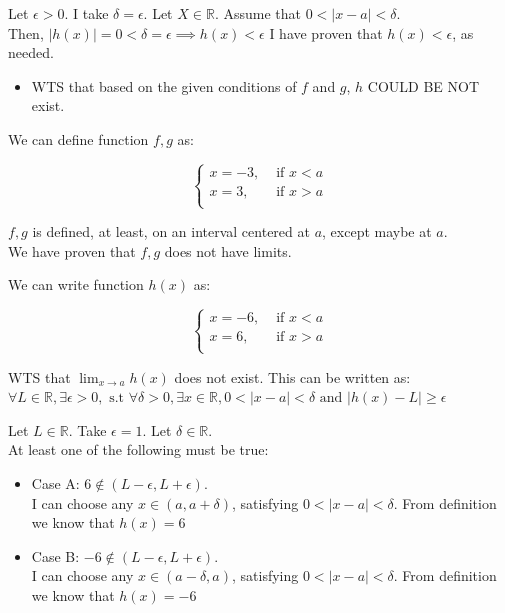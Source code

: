 \documentclass[12pt]{exam}
\newcommand {\DS} [1] {${\displaystyle #1}$}
\newcommand{\R}{\mathbb{R}}
\begin{document}
\begin{enumerate}
Let $\epsilon > 0.$ I take $\delta = \epsilon$. Let $X \in \R$. Assume that $0 < |x - a| < \delta$. \\
Then, $|h(x)| = 0 < \delta = \epsilon \implies h(x) < \epsilon$
I have proven that $h(x) < \epsilon$, as needed.


\begin{itemize}
	\item WTS that based on the given conditions of $f$ and $g$, $h$ COULD BE NOT exist.
\end{itemize}


We can define function $f, g$ as: 

$$
\begin{cases}
	x = -3, &\text{ if }x < a\\
	x = 3, &\text{ if } x > a\\
\end{cases}
$$

$f, g$ is defined, at least, on an interval centered at $a$, except maybe at $a$.\\

We have proven that $f, g$ does not have limits.

We can write function $h(x)$ as:

$$
\begin{cases}
	x = -6, &\text{ if }x < a\\
	x = 6, &\text{ if } x > a\\
\end{cases}
$$

WTS that \DS{\lim_{x \to a} h(x)} does not exist.
This can be written as: $\forall L \in \R, \exists \epsilon > 0, \mbox{ s.t } \forall \delta > 0, \exists x \in \R,
 0 < |x - a| < \delta \mbox{ and } |h(x) - L| \geq \epsilon$

Let $L \in \R$. Take $\epsilon = 1$. Let $\delta \in \R$.\\
At least one of the following must be true:

\begin{itemize}
	\item Case A: $6 \notin (L - \epsilon, L + \epsilon).$ \\ 
	I can choose any $x \in (a, a + \delta)$, satisfying $0 < |x - a| < \delta$. 
	From definition we know that $h(x) = 6$
\end{itemize}

\begin{itemize}
	\item Case B: $-6 \notin (L - \epsilon, L + \epsilon).$ \\ 
	I can choose any $x \in (a - \delta, a )$, satisfying $0 < |x - a| < \delta$. 
	From definition we know that $h(x) = -6$
\end{itemize}


\end{enumerate}
\end{document}
